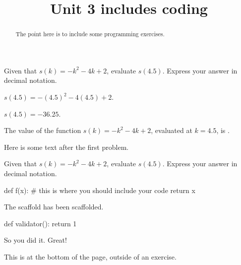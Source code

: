 \documentclass{ximera}
\title{Unit 3 includes coding}
\begin{document}
\begin{abstract}
  The point here is to include some programming exercises.
\end{abstract}

\begin{exercise}
Given that $s(k)=-k^2-4 k+2$, evaluate $s(4.5)$. Express your answer in decimal notation.
\begin{solution}
\begin{hint}
$s(4.5)=-(4.5)^2-4 (4.5)+2$.
\end{hint}
\begin{hint}
$s(4.5)=-36.25$.
\end{hint}
The value of the function $s(k)=-k^2-4 k+2$, evaluated at $k=4.5$, is .
\end{solution}

Here is some text after the first problem.
\end{exercise}

\begin{exercise}
Given that $s(k)=-k^2-4 k+2$, evaluate $s(4.5)$. Express your answer in decimal notation.

\begin{python-scaffold}
  def f(x):
    # this is where you should include your code
    return x
\end{python-scaffold}

The scaffold has been scaffolded.

\begin{python-validator}
  def validator():
    return 1
\end{python-validator}

So you did it.  Great!
\end{exercise}

This is at the bottom of the page, outside of an exercise.
\end{document}
